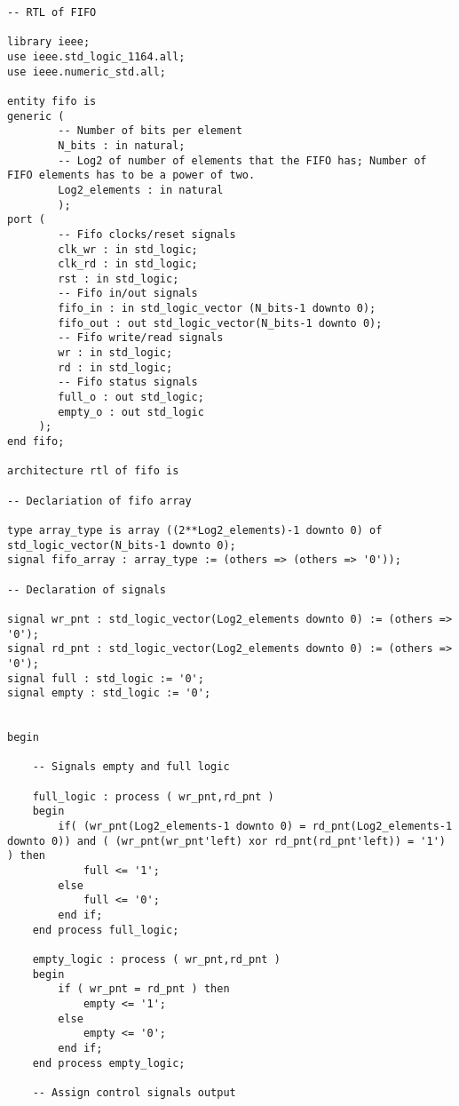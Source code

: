 \begin{code}
\begin{verbatim}
-- RTL of FIFO

library ieee;
use ieee.std_logic_1164.all;
use ieee.numeric_std.all;

entity fifo is
generic (  
        -- Number of bits per element 
        N_bits : in natural;
        -- Log2 of number of elements that the FIFO has; Number of FIFO elements has to be a power of two.
        Log2_elements : in natural
        );
port (
        -- Fifo clocks/reset signals        
        clk_wr : in std_logic;
        clk_rd : in std_logic;
        rst : in std_logic;
        -- Fifo in/out signals
        fifo_in : in std_logic_vector (N_bits-1 downto 0);
        fifo_out : out std_logic_vector(N_bits-1 downto 0);
        -- Fifo write/read signals
        wr : in std_logic;
        rd : in std_logic;
        -- Fifo status signals
        full_o : out std_logic;
        empty_o : out std_logic
     );
end fifo;

architecture rtl of fifo is

-- Declariation of fifo array

type array_type is array ((2**Log2_elements)-1 downto 0) of std_logic_vector(N_bits-1 downto 0);
signal fifo_array : array_type := (others => (others => '0'));

-- Declaration of signals

signal wr_pnt : std_logic_vector(Log2_elements downto 0) := (others => '0');
signal rd_pnt : std_logic_vector(Log2_elements downto 0) := (others => '0');
signal full : std_logic := '0';
signal empty : std_logic := '0';


begin

    -- Signals empty and full logic
    
    full_logic : process ( wr_pnt,rd_pnt )
    begin   
        if( (wr_pnt(Log2_elements-1 downto 0) = rd_pnt(Log2_elements-1 downto 0)) and ( (wr_pnt(wr_pnt'left) xor rd_pnt(rd_pnt'left)) = '1') ) then
            full <= '1';
        else
            full <= '0';
        end if;
    end process full_logic;    

    empty_logic : process ( wr_pnt,rd_pnt )  
    begin
        if ( wr_pnt = rd_pnt ) then
            empty <= '1';
        else
            empty <= '0';
        end if;
    end process empty_logic;

    -- Assign control signals output


\end{verbatim}
\end{code}
